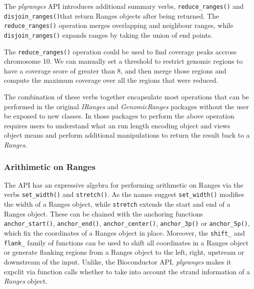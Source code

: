 \documentclass[10pt,letterpaper]{article}
\newenvironment{Shaded}{\begin{snugshade}}{\end{snugshade}}
\newcommand{\DataTypeTok}[1]{\textcolor[rgb]{0.13,0.29,0.53}{#1}}
\newcommand{\DecValTok}[1]{\textcolor[rgb]{0.00,0.00,0.81}{#1}}
\newcommand{\KeywordTok}[1]{\textcolor[rgb]{0.13,0.29,0.53}{\textbf{#1}}}
\newcommand{\NormalTok}[1]{#1}
\newcommand{\OperatorTok}[1]{\textcolor[rgb]{0.81,0.36,0.00}{\textbf{#1}}}
\newcommand{\StringTok}[1]{\textcolor[rgb]{0.31,0.60,0.02}{#1}}
\begin{document}
The \emph{plyranges} API introduces additional summary verbs,
\texttt{reduce\_ranges()} and \texttt{disjoin\_ranges()}that return
Ranges objects after being returned. The \texttt{reduce\_ranges()}
operation merges overlapping and neighbour ranges, while
\texttt{disjoin\_ranges()} expands ranges by taking the union of end
points.

The \texttt{reduce\_ranges()} operation could be used to find coverage
peaks accross chromosome 10. We can manually set a threshold to restrict
genomic regions to have a coverage score of greater than 8, and then
merge those regions and compute the maximum coverage over all the
regions that were reduced.

\begin{Shaded}
\end{Shaded}

The combination of these verbs together encapsulate most operations that
can be performed in the original \emph{IRanges} and \emph{GenomicRanges}
packages without the user be exposed to new classes. In those packages
to perform the above operation requires users to understand what an run
length encoding object and views object means and perform additional
manipulations to return the result back to a \emph{Ranges}.

\hypertarget{arithimetic-on-ranges}{%
\subsubsection{Arithimetic on Ranges}\label{arithimetic-on-ranges}}

The API has an expressive algebra for performing arithmetic on Ranges
via the verbs \texttt{set\_width()} and \texttt{stretch()}. As the names
suggest \texttt{set\_width()} modifies the width of a Ranges object,
while \texttt{stretch} extends the start and end of a Ranges object.
These can be chained with the anchoring functions
\texttt{anchor\_start()}, \texttt{anchor\_end()},
\texttt{anchor\_center()}, \texttt{anchor\_3p()} or
\texttt{anchor\_5p()}, which fix the coordinates of a Ranges object in
place. Moreover, the \texttt{shift\_} and \texttt{flank\_} family of
functions can be used to shift all coordinates in a Ranges object or
generate flanking regions from a Ranges object to the left, right,
upstream or downstream of the input. Unlike, the Bioconductor API,
\emph{plyranges} makes it expclit via function calls whether to take
into account the strand information of a \emph{Ranges} object.
\end{document}
